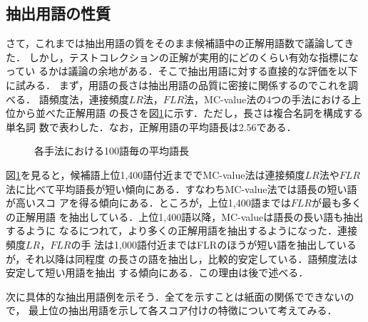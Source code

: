 \subsection{抽出用語の性質}

さて，これまでは抽出用語の質をそのまま候補語中の正解用語数で議論してきた．
しかし，テストコレクションの正解が実用的にどのくらい有効な指標になってい
るかは議論の余地がある．そこで抽出用語に対する直接的な評価を以下に試みる．
まず，用語の長さは抽出用語の品質に密接に関係するのでこれを調べる．
語頻度法，連接頻度$LR$法，$FLR$法，MC-value法の4つの手法における上位から並べた正解用語
の長さを図\ref{fig:gotyou}に示す．ただし，長さは複合名詞を構成する単名詞
数で表わした．なお，正解用語の平均語長は2.56である．
\begin{figure}[htbp]
\hspace*{\fill}
 
 \caption{各手法における100語毎の平均語長}
\label{fig:gotyou}
\hspace*{\fill}
\end{figure}
図\ref{fig:gotyou}を見ると，候補語上位1,400語付近まででMC-value法は連接頻度$LR$法や$FLR$法に比べて平均語長が短い傾向にある．すなわちMC-value法では語長の短い語が高いスコ
アを得る傾向にある．ところが，上位1,400語までは$FLR$が最も多くの正解用語
を抽出している．上位1,400語以降，MC-valueは語長の長い語も抽出するように
なるにつれて，より多くの正解用語を抽出するようになった．連接頻度$LR$，$FLR$の手
法は1,000語付近まではFLRのほうが短い語を抽出しているが，それ以降は同程度
の長さの語を抽出し，比較的安定している．語頻度法は安定して短い用語を抽出
する傾向にある．この理由は後で述べる．

次に具体的な抽出用語例を示そう．全てを示すことは紙面の関係でできないので，
最上位の抽出用語を示して各スコア付けの特徴について考えてみる．

